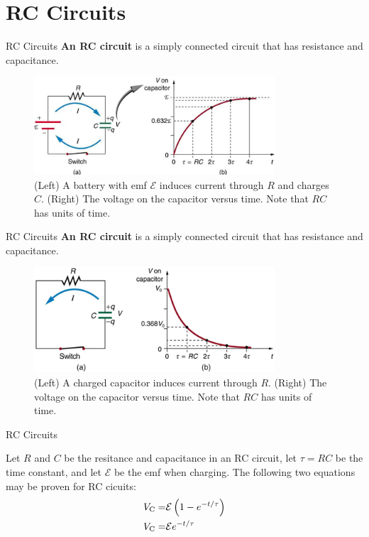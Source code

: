 \documentclass{beamer}
\begin{document}
\section{RC Circuits}

\begin{frame}{RC Circuits}
\textbf{\alert{An RC circuit}} is a simply connected circuit that has resistance and capacitance.
\begin{figure}
\centering
\includegraphics[width=0.8\textwidth]{figures/RC_1.png}
\caption{\label{fig:RC1} (Left) A battery with emf $\mathcal{E}$ induces current through $R$ and charges $C$.  (Right) The voltage on the capacitor versus time.  Note that $RC$ has units of time.}
\end{figure}
\end{frame}

\begin{frame}{RC Circuits}
\textbf{\alert{An RC circuit}} is a simply connected circuit that has resistance and capacitance.
\begin{figure}
\centering
\includegraphics[width=0.8\textwidth]{figures/RC_2.png}
\caption{\label{fig:RC2} (Left) A charged capacitor induces current through $R$.  (Right) The voltage on the capacitor versus time.  Note that $RC$ has units of time.}
\end{figure}
\end{frame}

\begin{frame}{RC Circuits}
\begin{tcolorbox}[colback=white,colframe=gray,title=RC Circuit Equations]
\alert{Let $R$ and $C$ be the resitance and capacitance in an RC circuit, let $\tau = RC$ be the time constant, and let $\mathcal{E}$ be the emf when charging.  The following two equations may be proven for RC cicuits:
\begin{align}
V_{\rm C} =& \mathcal{E}\left(1 - e^{-t/\tau}\right) \\
V_{\rm C} =& \mathcal{E}e^{-t/\tau}
\end{align}}
\end{tcolorbox}
\end{frame}
\end{document}
